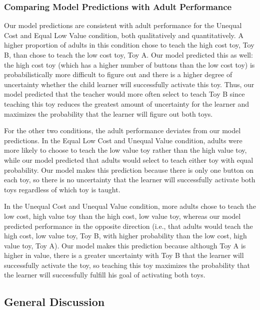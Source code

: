 \documentclass[10pt,letterpaper]{article}
\begin{document}
\subsubsection{Comparing Model Predictions with Adult Performance}
Our model predictions are consistent with adult performance for the Unequal Cost and Equal Low Value condition, both qualitatively and quantitatively. A higher proportion of adults in this condition chose to teach the high cost toy, Toy B, than chose to teach the low cost toy, Toy A. Our model predicted this as well: the high cost toy (which has a higher number of buttons than the low cost toy) is probabilistically more difficult to figure out and there is a higher degree of uncertainty whether the child learner will successfully activate this toy. Thus, our model predicted that the teacher would more often select to teach Toy B since teaching this toy reduces the greatest amount of uncertainty for the learner and maximizes the probability that the learner will figure out both toys. 

For the other two conditions, the adult performance deviates from our model predictions. In the Equal Low Cost and Unequal Value condition, adults were more likely to choose to teach the low value toy rather than the high value toy, while our model predicted that adults would select to teach either toy with equal probability. Our model makes this prediction because there is only one button on each toy, so there is no uncertainty that the learner will successfully activate both toys regardless of which toy is taught.

In the Unequal Cost and Unequal Value condition, more adults chose to teach the low cost, high value toy than the high cost, low value toy, whereas our model predicted performance in the opposite direction (i.e., that adults would teach the high cost, low value toy, Toy B, with higher probability than the low cost, high value toy, Toy A). Our model makes this prediction because although Toy A is higher in value, there is a greater uncertainty with Toy B that the learner will successfully activate the toy, so teaching this toy maximizes the probability that the learner will successfully fulfill his goal of activating both toys.

\subsection{General Discussion}
\end{document}

